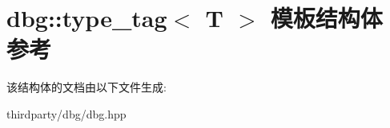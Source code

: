 \hypertarget{structdbg_1_1type__tag}{}\section{dbg\+:\+:type\+\_\+tag$<$ T $>$ 模板结构体 参考}
\label{structdbg_1_1type__tag}


该结构体的文档由以下文件生成\+:\begin{DoxyCompactItemize}
\item 
thirdparty/dbg/dbg.\+hpp\end{DoxyCompactItemize}
